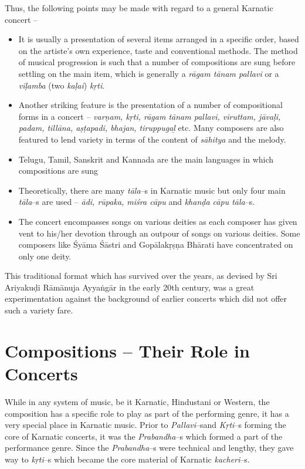 Thus, the following points may be made with regard to a general Karnatic concert –

\begin{itemize}
\itemsep=0pt
\item It is usually a presentation of several items arranged in a specific order, based on the artiste’s own experience, taste and conventional methods. The method of musical progression is such that a number of compositions are sung before settling on the main item, which is generally a \textit{rāgam tānam pallavi} or a \textit{viḷamba} (two \textit{kaḷai}) \textit{kṛti}.

 \item Another striking feature is the presentation of a number of compositional forms in a concert – \textit{varṇam, kṛti, rāgam tānam pallavi, viruttam, jāvaḷi, padam, tillāna, aṣṭapadi, bhajan, tiruppugaḻ} etc. Many composers are also featured to lend variety in terms of the content of \textit{sāhitya} and the melody.

 \item Telugu, Tamil, Sanskrit and Kannada are the main languages in which compositions are sung

 \item Theoretically, there are many \textit{tāla}–s in Karnatic music but only four main \textit{tāla}–s are used – \textit{ādi, rūpaka, miśra cāpu} and \textit{khanḍa cāpu tāla}–s.

 \item The concert encompasses songs on various deities as each composer has given vent to his/her devotion through an outpour of songs on various deities. Some composers like Śyāma Śāstri and Gopālakṛṣṇa Bhārati have concentrated on only one deity.

\end{itemize}

This traditional format which has survived over the years, as devised by Sri Ariyakuḍi Rāmānuja Ayyaṅgār in the early 20th century, was a great experimentation against the background of earlier concerts which did not offer such a variety fare.

\vspace{-.3cm}

\section*{Compositions – Their Role in Concerts}

While in any system of music, be it Karnatic, Hindustani or Western, the composition has a specific role to play as part of the performing genre, it has a very special place in Karnatic music. Prior to \textit{Pallavi}–s\break and \textit{Kṛti}–s forming the core of Karnatic concerts, it was the \textit{Praban\break dha}–s which formed a part of the performance genre. Since the \textit{Prabandha}–s were technical and lengthy, they gave way to \textit{kṛti}–s which became the core material of Karnatic \textit{kacheri}–s.

